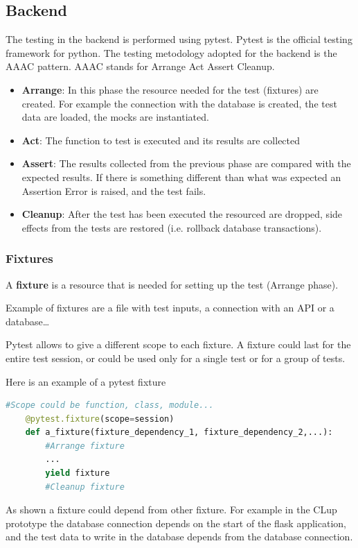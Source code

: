 \subsection{Backend}
The testing in the backend is performed using pytest.
Pytest is the official testing framework for python. 
The testing metodology adopted for the backend is the AAAC pattern.
AAAC stands for Arrange Act Assert Cleanup.
\begin{itemize}
    \item \textbf{Arrange}: In this phase the resource needed for the test (fixtures) are created. For example the connection with the database is created, the test data are loaded, the mocks are instantiated.
    \item \textbf{Act}: The function to test is executed and its results are collected
    \item \textbf{Assert}: The results collected from the previous phase are compared with the expected results. If there is something different than what was expected an Assertion Error is raised, and the test fails.
    \item \textbf{Cleanup}: After the test has been executed the resourced are dropped, side effects from the tests are restored (i.e. rollback database transactions).
\end{itemize}

\subsubsection{Fixtures}
A \textbf{fixture} is a resource that is needed for setting up the test (Arrange phase).

Example of fixtures are a file with test inputs, a connection with an API or a database\ldots

Pytest allows to give a different scope to each fixture. A fixture could last for the entire test session, or could be used only for a single test or for a group of tests.

Here is an example of a pytest fixture
\begin{lstlisting}[language=python]
    #Scope could be function, class, module...
    @pytest.fixture(scope=session)
    def a_fixture(fixture_dependency_1, fixture_dependency_2,...):
        #Arrange fixture
        ... 
        yield fixture 
        #Cleanup fixture
\end{lstlisting}
As shown a fixture could depend from other fixture. For example in the CLup prototype the database connection depends on the start of the flask application, and the test data to write in the database depends from the database connection.


